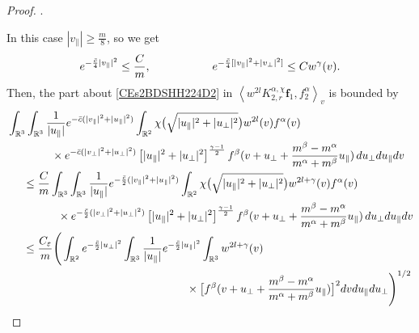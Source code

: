 \documentclass[reqno]{amsart}
\numberwithin{equation}{section}
\numberwithin{equation}{section}
\begin{document}
\begin{proof}
		.
		
		In this case $|v_{\parallel}|\geq \frac{m}{8}$, so we get 
		\begin{equation}\label{sec2CaseB1}
			e^{-\frac{\bar{c}}{4}|v_{\parallel}|^2} \leq \frac{C}{m}, \hspace{1.9cm} e^{-\frac{\bar{c}}{4}[|v_{\parallel}|^2+|v_{\perp}|^2]} \leq C w^{\gamma}(v).
		\end{equation}
		Then, the  part about \eqref{CEs2BDSHH224D2} in $\left \langle  w^{2l}K_{2,r}^{\alpha,\chi}\mathbf{f}_1,f^{\alpha}_2\right \rangle_v$ is bounded by
		\begin{align}
			&\int_{\mathbb{R}^3} \int_{\mathbb{R}^3} \frac{1}{|u_{\parallel}|} e^{-\bar{c}(|v_{\parallel}|^2+|u_{\parallel}|^2)}\int_{\mathbb{R}^2} \chi\big(\sqrt{|u_{\parallel}|^2 + |u_{\perp}|^2}\big) w^{2l}(v)f^\alpha(v) \notag\\
			&\hspace{1.4cm} \times  e^{-\bar{c}(|v_{\perp}|^2+|u_{\perp}|^2) } \left[|u_{\parallel}|^2 + |u_{\perp}|^2\right]^{\frac{\gamma - 1}{2}}f^\beta(v + u_{\perp}+\frac{m^{\beta}-m^{\alpha}}{m^{\alpha}+m^{\beta}}u_{\parallel})  \, du_{\perp} du_{\parallel} dv \notag\\
			&\hspace{0.5cm}\leq \frac{C}{m}\int_{\mathbb{R}^3} \int_{\mathbb{R}^3} \frac{1}{|u_{\parallel}|} e^{-\frac{\bar{c}}{2}(|v_{\parallel}|^2+|u_{\parallel}|^2)}\int_{\mathbb{R}^2} \chi\big(\sqrt{|u_{\parallel}|^2 + |u_{\perp}|^2}\big) w^{2l+\gamma}(v)f^\alpha(v) \notag\\
			&\hspace{1.6cm}\times  e^{-\frac{\bar{c}}{2}(|v_{\perp}|^2+|u_{\perp}|^2) } \left[|u_{\parallel}|^2 + |u_{\perp}|^2\right]^{\frac{\gamma - 1}{2}}f^\beta(v + u_{\perp}+\frac{m^{\beta}-m^{\alpha}}{m^{\alpha}+m^{\beta}}u_{\parallel})  \, du_{\perp} du_{\parallel} dv \notag\\
			&\hspace{0.5cm}\leq \frac{C_{\varepsilon}}{m} \Bigg(\int_{\mathbb{R}^2}  
			e^{-\frac{\bar{c}}{2}|u_{\perp}|^2 } 
			\int_{\mathbb{R}^3}\frac{1}{|u_{\parallel}|}e^{-\frac{\bar{c}}{2}|u_{\parallel}|^2} \int_{\mathbb{R}^3}w^{2l+\gamma}(v)\notag\\
			&\hspace{5.7cm}\times \big[f^\beta(v + u_{\perp}+\frac{m^{\beta}-m^{\alpha}}{m^{\alpha}+m^{\beta}}u_{\parallel})\big]^2dvdu_{\parallel}du_{\perp}\Bigg)^{1/2}\label{sec2socal237}\\

\end{align}
\end{proof}
\end{document}
